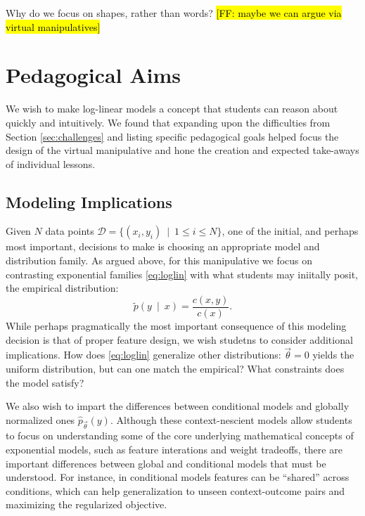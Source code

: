 \documentclass[11pt,letterpaper]{article}
\newcommand{\Note}[1]{}
\renewcommand{\Note}[1]{\hl{[#1]}}
\newcommand{\NoteSigned}[3]{{\sethlcolor{#2}\Note{#1: #3}}}
\newcommand{\NoteFF}[1]{\NoteSigned{FF}{LightBlue}{#1}}
\newcommand{\empirical}[0]{\ensuremath{\tilde{p}}}
\newcommand{\Data}[0]{\ensuremath{\mathcal{D}}}
\begin{document}
Why do we focus on shapes, rather than words? \NoteFF{maybe we can argue via virtual manipulatives}


\section{Pedagogical Aims}\label{sec:aims}
We wish to make log-linear models a concept that students can
reason about quickly and intuitively. We found that expanding upon the difficulties from 
Section \ref{sec:challenges} and listing specific pedagogical goals helped focus the design 
of the virtual manipulative and hone the creation and expected take-aways of individual lessons. 

\subsection{Modeling Implications}
Given $N$ data points $\Data{} = \{( x_i, y_i)\ \mid\ 1 \le i \le N\}$, one of the initial, and perhaps most important, decisions 
to make is choosing an appropriate model and distribution family. As argued above, for this manipulative we focus on 
contrasting exponential families \eqref{eq:loglin} with what students may iniitally posit, the empirical distribution:
\begin{equation}
\empirical\left(y\ \mid\ x\right) = \frac{c(x,y)}{c(x)}.
\label{eqn:empirical_distr}
\end{equation}
While perhaps pragmatically the most important consequence of this modeling decision is that of 
proper feature design, we wish studetns to consider additional implications.  
How does \eqref{eq:loglin} generalize other distributions: $\vec{\theta} = 0$ 
yields the uniform distribution, but can one match the empirical? What constraints does 
the model satisfy?
 
We also wish to impart the differences between conditional models and globally normalized ones 
$\hat{p}_{\vec{\theta}}\left(y\right)$. Although these context-nescient models allow students 
to focus on understanding some of the core underlying mathematical concepts of 
exponential models, such as feature interations and weight tradeoffs, there are important differences
between global and conditional models that must be understood. For instance, in conditional models
features can be ``shared'' across conditions, which can help %
generalization to unseen context-outcome pairs and maximizing the regularized objective.
\end{document}
